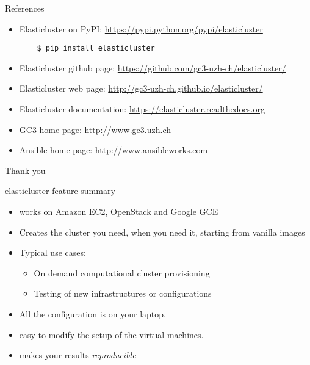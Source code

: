 \documentclass[english,serif,mathserif,usenames,dvipsnames]{beamer}
\begin{document}
\begin{frame}[fragile]
  {References}
  \begin{itemize}
  \item Elasticluster on PyPI:
    \url{https://pypi.python.org/pypi/elasticluster}

\begin{verbatim}
    $ pip install elasticluster
\end{verbatim}

  \item Elasticluster github page: 
    \url{https://github.com/gc3-uzh-ch/elasticluster/}
  \item Elasticluster web page: 
    \url{http://gc3-uzh-ch.github.io/elasticluster/}
  \item Elasticluster documentation:
    \url{https://elasticluster.readthedocs.org}
  \item GC3 home page: \url{http://www.gc3.uzh.ch}
  \item Ansible home page: \url{http://www.ansibleworks.com}
  \end{itemize}
\end{frame}

\begin{frame}
  \begin{center}
    \Huge Thank you
  \end{center}
\end{frame}

\begin{frame}
  {elasticluster feature summary}
  \begin{itemize}
  \item works on Amazon EC2, OpenStack and Google GCE
  \item Creates the cluster you need, when you need it, starting from
    vanilla images
  \item Typical use cases:
    \begin{itemize}
    \item On demand computational cluster provisioning
    \item Testing of new infrastructures or configurations
    \end{itemize}
    
  \item All the configuration is on your laptop.
  \item easy to modify the setup of the virtual machines.
  \item makes your results \textit{reproducible}
  \end{itemize}
\end{frame}
\end{document}
